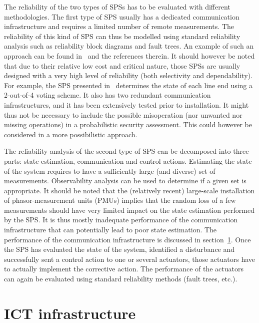 The reliability of the two types of SPSs has to be evaluated with different methodologies. The first type of SPS usually has a dedicated communication infrastructure and requires a limited number of remote measurements. The reliability of this kind of SPS can thus be modelled using standard reliability analysis such as reliability block diagrams and fault trees. An example of such an approach can be found in~\cite{SPSreliabilityThesis} and the references therein. It should however be noted that due to their relative low cost and critical nature, those SPSs are usually designed with a very high level of reliability (both selectivity and dependability). For example, the SPS presented in~\cite{BelgiumSPS} determines the state of each line end using a 2-out-of-4 voting scheme. It also has two redundant communication infrastructures, and it has been extensively tested prior to installation. It might thus not be necessary to include the possible misoperation (nor unwanted nor missing operations) in a probabilistic security assessment. This could however be considered in a more possibilistic approach.

The reliability analysis of the second type of SPS can be decomposed into three parts: state estimation, communication and control actions. Estimating the state of the system requires to have a sufficiently large (and diverse) set of measurements. Observability analysis can be used to determine if a given set is appropriate. It should be noted that the (relatively recent) large-scale installation of phasor-measurement units (PMUs) implies that the random loss of a few measurements should have very limited impact on the state estimation performed by the SPS. It is thus mostly inadequate performance of the communication infrastructure that can potentially lead to poor state estimation. The performance of the communication infrastructure is discussed in section~\ref{sec:SPS-ICT}. Once the SPS has evaluated the state of the system, identified a disturbance and successfully sent a control action to one or several actuators, those actuators have to actually implement the corrective action. The performance of the actuators can again be evaluated using standard reliability methods (fault trees, etc.).

\section{ICT infrastructure}
\label{sec:SPS-ICT}

